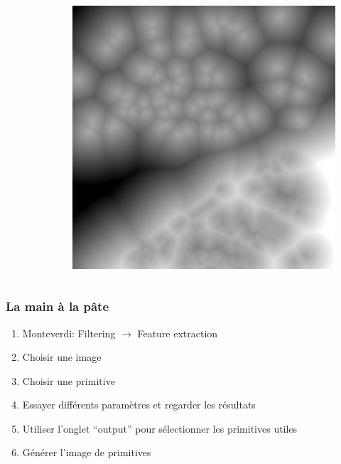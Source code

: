\documentclass[compress]{beamer}
\begin{document}
\begin{frame}
\begin{columns}
\begin{column}{0.32\textwidth}
\begin{figure}[]
\end{figure}
\end{column}
\begin{column}{0.32\textwidth}
\begin{figure}[]
  \includegraphics[width=1.0\textwidth]{DistanceFromWater.jpg}
\end{figure}
\end{column}
\end{columns}
\end{frame}


\begin{frame}
\frametitle{La main à la pâte}
\begin{enumerate}
\item Monteverdi: Filtering $\rightarrow$ Feature extraction
\item Choisir une image
\item Choisir une primitive
\item Essayer différents paramètres et regarder les résultats
\item Utiliser l'onglet ``output'' pour sélectionner les primitives utiles
\item Générer l'image de primitives
\end{enumerate}

\end{frame}
\end{document}
